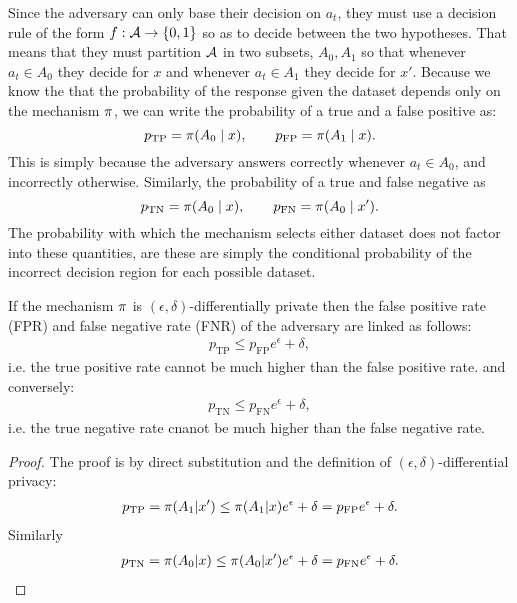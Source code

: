 Since the adversary can only base their decision on $a_t$, they must
use a decision rule of the form $f : {\mathcal{A}} \to \{0,1\}$ so as to decide
between the two hypotheses.  That means that they must partition ${\mathcal{A}}$
in two subsets, $A_0, A_1$ so that whenever $a_t \in A_0$ they
decide for $x$ and whenever $a_t \in A_1$ they decide for
$x'$. Because we know the that the probability of the 
response given the dataset depends only on the mechanism $\pi$, we
can write the probability of a true and a false positive as:
\[
  p_{\textrm{TP}} = \pi(A_0 \mid x), \qquad p_{\textrm{FP}} = \pi(A_1 \mid x).
\]
This is simply because the adversary answers correctly whenever
$a_t \in A_0$, and incorrectly otherwise. Similarly, the probability
of a true and false negative as
\[
  p_{\textrm{TN}} = \pi(A_0 \mid x), \qquad p_{\textrm{FN}} = \pi(A_0 \mid x').
\]
The probability with which the mechanism selects either dataset does
not factor into these quantities, are these are simply the conditional
probability of the incorrect decision region for each possible
dataset.

\begin{theorem}
  If the mechanism $\pi$ is $(\epsilon, \delta)$-differentially private then
  the false positive rate (FPR) and false negative rate (FNR) of the
  adversary are linked as follows:
  \begin{align*}
    p_{\textrm{TP}}\leq p_{\textrm{FP}} e^\epsilon  + \delta,
  \end{align*}
  i.e. the true positive rate cannot be much higher than the false positive rate. and conversely:
  \begin{align*}
    p_{\textrm{TN}}\leq p_{\textrm{FN}} e^\epsilon  + \delta,
  \end{align*}
  i.e. the true negative rate cnanot be much higher than the false
  negative rate.
\end{theorem}
\begin{proof}
  The proof is by direct substitution and the definition of $(\epsilon, \delta)$-differential privacy:
  \begin{align*}
    p_{\textrm{TP}} = \pi(A_1 | x') \leq \pi(A_1 | x) e^\epsilon  + \delta = p_{\textrm{FP}} e^\epsilon  + \delta.
  \end{align*}
  Similarly
  \begin{align*}
    p_{\textrm{TN}} = \pi(A_0 | x) \leq \pi(A_0 | x') e^\epsilon  + \delta
    = p_{\textrm{FN}} e^\epsilon  + \delta.
  \end{align*}
\end{proof}

